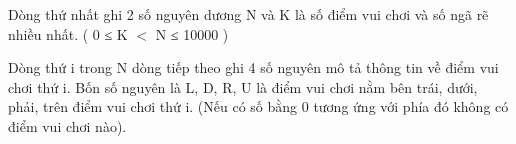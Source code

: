 Dòng thứ nhất ghi 2 số nguyên dương N và K là số điểm vui chơi và số ngã rẽ nhiều nhất. ( 0 ≤ K $<$ N ≤ 10000 )  

   Dòng thứ i trong N dòng tiếp theo ghi 4 số nguyên mô tả thông tin về điểm vui chơi thứ i. Bốn số nguyên là L, D, R, U là điểm vui chơi nằm bên trái, dưới, phải, trên điểm vui chơi thứ i. (Nếu có số bằng 0 tương ứng với phía đó không có điểm vui chơi nào).